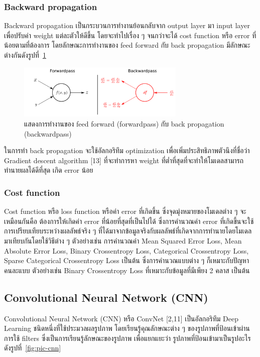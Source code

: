 \documentclass[12pt,oneside,openright,a4paper]{cpe-thai-project}
\begin{document}
\subsubsection{Backward propagation}
\par\setlength{\parindent}{5ex}
Backward propagation เป็นกระบวนการทำงานย้อนกลับจาก output layer มา input layer เพื่อปรับค่า weight แต่ละตัวให้ดีขึ้น โดยจะทำไปเรื่อง ๆ จนกว่าจะได้ cost function หรือ error ที่น้อยตามที่ต้องการ 
โดยลักษณะการทำงานของ feed forward กับ back propagation มีลักษณะต่างกันดังรูปที่~\ref{fig:feed-back}

\begin{figure}[!h]
  \centering
  \includegraphics[width=8cm]{./image/feed_back.png}
  \caption{แสดงการทำงานของ feed forward (forwardpass) กับ back propagation (backwardpass)}
  \label{fig:feed-back}
\end{figure}

\par\setlength{\parindent}{5ex}
ในการทำ back propagation จะใช้อัลกอริทึม optimization เพื่อเพิ่มประสิทธิภาพตัวนึงที่ชื่อว่า Gradient descent algorithm [13] ที่จะทำการหา weight ที่ต่ำที่สุดที่จะทำให้โมเดลสามารถทำนายผลได้ดีที่สุด เกิด error น้อย

\subsubsection{Cost function}
\par\setlength{\parindent}{5ex}
Cost function หรือ loss function หรือค่า error ที่เกิดขึ้น ซึ่งจุดมุ่งหมายของโมเดลต่าง ๆ จะเหมือนกันคือ ต้องการให้เกิดค่า error ที่น้อยที่สุดที่เป็นไปได้ ซึ่งการคำนวณค่า error ที่เกิดขึ้นจะใช้การเปรียบเทียบระหว่างผลลัพธ์จริง ๆ ที่ได้มาจากข้อมูลจริงกับผลลัพธ์ที่เกิดจากการทำนายโดยโมเดลมาเทียบกันโดยใช้วิธีต่าง ๆ ตัวอย่างเช่น การคำนวณค่า Mean Squared Error Loss, Mean Absolute Error Loss, Binary Crossentropy Loss, Categorical Crossentropy Loss, Sparse Categorical Crossentropy Loss เป็นต้น ซึ่งการคำนวณแบบต่าง ๆ ก็เหมาะกับปัญหาคนละแบบ ตัวอย่างเช่น Binary Crossentropy Loss ที่เหมาะกับข้อมูลที่มีเพียง 2 คลาส เป็นต้น

\subsection{Convolutional Neural Network (CNN)}
\par\setlength{\parindent}{5ex}
Convolutional Neural Network (CNN) หรือ ConvNet [2,11] เป็นอัลกอริทึม Deep Learning 
ชนิดหนึ่งที่ใช้ประมวลผลรูปภาพ โดยเรียนรู้คุณลักษณะต่าง ๆ ของรูปภาพที่ป้อนเข้าผ่านการใช้ filters 
ซึ่งเป็นการเรียนรู้ลักษณะของรูปภาพ เพื่อแยกแยะว่า รูปภาพที่ป้อนเข้ามาเป็นรูปอะไรดังรูปที่~\ref{fig:pic-cnn}
\end{document}

